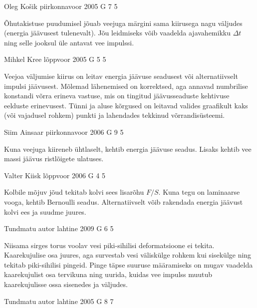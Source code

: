 \documentclass[11pt]{article}
\begin{document}
{%
{Oleg Košik} %
{piirkonnavoor} %
{2005} %
{G 7} %
{5} %
{

\ifHint
Õhutakistuse puudumisel jõuab veejuga märgini sama kiirusega nagu väljudes (energia jäävusest tulenevalt). Jõu leidmiseks võib vaadelda ajavahemikku $\Delta t$ ning selle jooksul üle antavat vee impulssi.
\fi
}

{Mihkel Kree} %
{lõppvoor} %
{2005} %
{G 5} %
{5} %
{

\ifHint
Veejoa väljumise kiirus on leitav energia jäävuse seadusest või alternatiivselt impulsi jäävusest. Mõlemad lähenemised on korrektsed, aga annavad numbrilise konstandi võrra erineva vastuse, mis on tingitud jäävusseaduste kehtivuse eelduste erinevusest. Tünni ja aluse kõrgused on leitavad valides graafikult kaks (või vajadusel rohkem) punkti ja lahendades tekkinud võrrandisüsteemi.
\fi
}

{Siim Ainsaar} %
{piirkonnavoor} %
{2006} %
{G 9} %
{5} %
{

\ifHint
Kuna veejuga kiireneb ühtlaselt, kehtib energia jäävuse seadus. Lisaks kehtib vee massi jäävus ristlõigete ulatuses.
\fi
}

{Valter Kiisk} %
{lõppvoor} %
{2006} %
{G 4} %
{5} %
{

\ifHint
Kolbile mõjuv jõud tekitab kolvi sees lisarõhu $F/S$. Kuna tegu on laminaarse vooga, kehtib Bernoulli seadus. Alternatiivselt võib rakendada energia jäävust kolvi ees ja suudme juures.
\fi
}

{Tundmatu autor} %
{lahtine} %
{2009} %
{G 6} %
{5} %
{

\ifHint
Niisama sirges torus voolav vesi piki-sihilisi deformatsioone ei tekita. Kaarekujulise osa juures, aga survestab vesi väliskülge rohkem kui sisekülge ning tekitab piki-sihilisi pingeid. Pinge täpse suuruse määramiseks on mugav vaadelda kaarekujulist osa tervikuna ning uurida, kuidas vee impulss muutub kaarekujulisse ossa sisenedes ja väljudes.
\fi
}

{Tundmatu autor} %
{lahtine} %
{2005} %
{G 8} %
{7} %
{

}}
\end{document}
